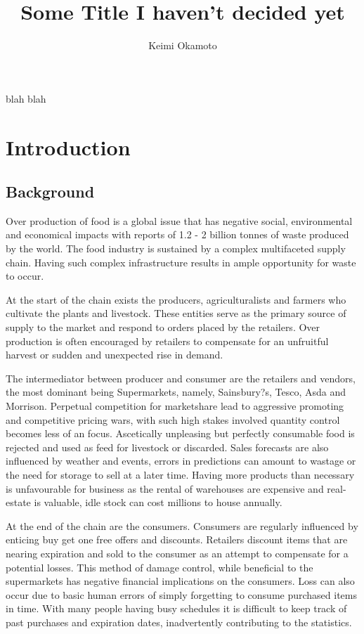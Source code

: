 \documentclass[a4paper, 11pt]{article}
\title{Some Title I haven't decided yet}
\author{Keimi Okamoto}
\begin{document}
\maketitle
\tableofcontents
\clearpage

blah blah
\clearpage

\section{Introduction}

\subsection{Background}
Over production of food is a global issue that has negative social, environmental and economical impacts with reports of 1.2 - 2 billion tonnes of waste produced by the world. The food industry is sustained by a complex multifaceted supply chain. Having such complex infrastructure results in ample opportunity for waste to occur. 

At the start of the chain exists the producers, agriculturalists and farmers who cultivate the plants and livestock. These entities serve as the primary source of supply to the market and respond to orders placed by the retailers. Over production is often encouraged by retailers to compensate for an unfruitful harvest or sudden and unexpected rise in demand. 

The intermediator between producer and consumer are the retailers and vendors, the most dominant being Supermarkets, namely, Sainsbury?s, Tesco, Asda and Morrison. Perpetual competition for marketshare lead to aggressive promoting and competitive pricing wars, with such high stakes involved quantity control becomes less of an focus. Ascetically unpleasing but perfectly consumable food is rejected and used as feed for livestock or discarded. Sales forecasts are also influenced by weather and events, errors in predictions can amount to wastage or the need for storage to sell at a later time. Having more products than necessary is unfavourable for business as the rental of warehouses are expensive and real-estate is valuable, idle stock can cost millions to house annually.

At the end of the chain are the consumers. Consumers are regularly influenced by enticing buy get one free offers and discounts. Retailers discount items that are nearing expiration and sold to the consumer as an attempt to compensate for a potential losses. This method of damage control, while beneficial to the supermarkets has negative financial implications on the consumers. Loss can also occur due to basic human errors of simply forgetting to consume purchased items in time. With many people having busy schedules it is difficult to keep track of past purchases and expiration dates, inadvertently contributing to the statistics.
\end{document}
